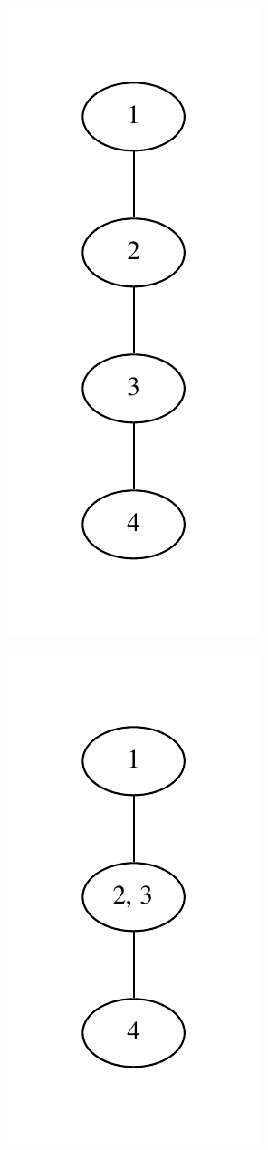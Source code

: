 \documentclass{scrartcl}
\begin{document}
\begin{figure}[h!]
\centering
\begin{subfigure}{.5\textwidth}
	\centering
	\includegraphics[scale=0.8]{kontrakt.pdf}
\end{subfigure}%
\begin{subfigure}{.5\textwidth}
	\centering
	\includegraphics[scale=0.8]{kontrakt2.pdf}

\end{subfigure}
\end{figure}
\end{document}
